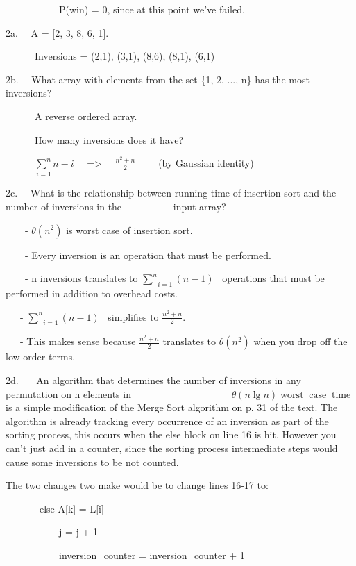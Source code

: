\documentclass{article}
\newcommand{\tmop}[1]{\ensuremath{\operatorname{#1}}}
\begin{document}
\ \ \ \ \ \ \ \ \ \ \ P(win) = 0, since at this point we've failed. \ \ \ \



2a. \ \ A = [2, 3, 8, 6, 1].

\ \ \ \ \ \ Inversions = (2,1), (3,1), (8,6), (8,1), (6,1)

2b. \ \ What array with elements from the set \{1, 2, ..., n\} has the most
inversions?

\ \ \ \ \ \ A reverse ordered array.

\ \ \ \ \ \ How many inversions does it have?

\ \ \ \ \ \ $\underset{i = 1}{\overset{}{} \overset{n}{\sum} \overset{}{} } n
- i$ \ \ => \ \ $\frac{n^2 + n}{2}$ \ \ \ \ (by Gaussian identity)



2c. \ \ What is the relationship between running time of insertion sort and
the number of inversions in the \ \ \ \ \ \ \ \ \ \ input array?

\ \ \ \ - $\theta ( n^2)$ is worst case of insertion sort.

\ \ \ \ - Every inversion is an operation that must be performed.

\ \ \ \ - n inversions translates to $\underset{i = 1}{\overset{n}{\sum}} ( n
- 1) $ \ operations that must be performed in addition to overhead costs.

\ \ \ - $\underset{i = 1}{\overset{n}{\sum}} ( n - 1) $ \ simplifies to
$\frac{n^2 + n}{2} .$

\ \ \ - This makes sense because $\frac{n^2 + n}{2}$ translates to $\theta (
n^2)$ when you drop off the low order terms.

2d. \ \ \ An algorithm that determines the number of inversions in any
permutation on n elements in \ \ \ \ \ \ \ \ \ \ \ \ \ \ \ \ \ \ \ \ $\theta (
n \lg n) \tmop{worst} \tmop{case} \tmop{time}$ is a simple modification of the
Merge Sort algorithm on p. 31 of the text. The algorithm is already tracking
every occurrence of an inversion as part of the sorting process, this occurs
when the else block on line 16 is hit. However you can't just add in a
counter, since the sorting process intermediate steps would cause some
inversions to be not counted.

The two changes two make would be to change lines 16-17 to:

\ \ \ \ \ \ \ else A[k] = L[i]

\ \ \ \ \ \ \ \ \ \ \ j = j + 1

\ \ \ \ \ \ \ \ \ \ \ inversion\_counter = inversion\_counter + 1
\end{document}
